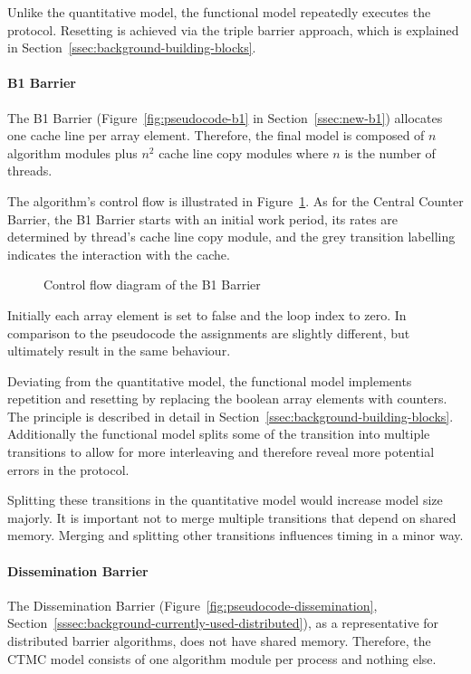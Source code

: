 \documentclass[a4paper, 10pt]{article}
\begin{document}
Unlike the quantitative model, the functional model repeatedly executes the protocol. Resetting is achieved via the triple barrier approach, which is explained in Section~\ref{ssec:background-building-blocks}.

\paragraph{B1 Barrier}
\label{ssssec:analysis-modelchecking-modelling-b1}
The B1 Barrier (Figure~\ref{fig:pseudocode-b1} in Section~\ref{ssec:new-b1}) allocates one cache line per array element. Therefore, the final model is composed of $n$ algorithm modules plus $n^2$ cache line copy modules where $n$ is the number of threads.

The algorithm's control flow is illustrated in Figure~\ref{fig:model-b1}. As for the Central Counter Barrier, the B1 Barrier starts with an initial work period, its rates are determined by thread's cache line copy module, and the grey transition labelling indicates the interaction with the cache.

\begin{figure}[htbp]
	\centering
	
	\caption{Control flow diagram of the B1 Barrier}
	\label{fig:model-b1}
\end{figure}

Initially each array element is set to false and the loop index to zero.
In comparison to the pseudocode the assignments are slightly different, but ultimately result in the same behaviour.

Deviating from the quantitative model, the functional model implements repetition and resetting by replacing the boolean array elements with counters. The principle is described in detail in Section~\ref{ssec:background-building-blocks}.
Additionally the functional model splits some of the transition into multiple transitions to allow for more interleaving and therefore reveal more potential errors in the protocol.

Splitting these transitions in the quantitative model would increase model size majorly. It is important not to merge multiple transitions that depend on shared memory. Merging and splitting other transitions influences timing in a minor way.

\paragraph{Dissemination Barrier}
\label{ssssec:analysis-modelchecking-modelling-dissemination}
The Dissemination Barrier (Figure~\ref{fig:pseudocode-dissemination}, Section~\ref{sssec:background-currently-used-distributed}), as a representative for distributed barrier algorithms, does not have shared memory. Therefore, the CTMC model consists of one algorithm module per process and nothing else.
\end{document}
